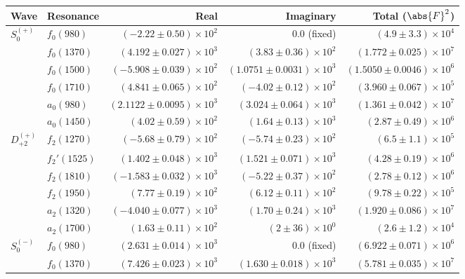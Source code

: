 \begin{table}[ht]
    \begin{center}
        \begin{tabular}{llrrr}\toprule
        Wave & Resonance & Real & Imaginary & Total ($\abs{F}^2$) \\\midrule
$S_{0}^{(+)}$ & $f_{0}(980)$ & $(-2.22 \pm 0.50) \times 10^{2}$ & $0.0$ (fixed) & $(4.9 \pm 3.3) \times 10^{4}$ \\
 & $f_{0}(1370)$ & $(4.192 \pm 0.027) \times 10^{3}$ & $(3.83 \pm 0.36) \times 10^{2}$ & $(1.772 \pm 0.025) \times 10^{7}$ \\
 & $f_{0}(1500)$ & $(-5.908 \pm 0.039) \times 10^{2}$ & $(1.0751 \pm 0.0031) \times 10^{3}$ & $(1.5050 \pm 0.0046) \times 10^{6}$ \\
 & $f_{0}(1710)$ & $(4.841 \pm 0.065) \times 10^{2}$ & $(-4.02 \pm 0.12) \times 10^{2}$ & $(3.960 \pm 0.067) \times 10^{5}$ \\
 & $a_{0}(980)$ & $(2.1122 \pm 0.0095) \times 10^{3}$ & $(3.024 \pm 0.064) \times 10^{3}$ & $(1.361 \pm 0.042) \times 10^{7}$ \\
 & $a_{0}(1450)$ & $(4.02 \pm 0.59) \times 10^{2}$ & $(1.64 \pm 0.13) \times 10^{3}$ & $(2.87 \pm 0.49) \times 10^{6}$ \\
$D_{+2}^{(+)}$ & $f_{2}(1270)$ & $(-5.68 \pm 0.79) \times 10^{2}$ & $(-5.74 \pm 0.23) \times 10^{2}$ & $(6.5 \pm 1.1) \times 10^{5}$ \\
 & $f_{2}'(1525)$ & $(1.402 \pm 0.048) \times 10^{3}$ & $(1.521 \pm 0.071) \times 10^{3}$ & $(4.28 \pm 0.19) \times 10^{6}$ \\
 & $f_{2}(1810)$ & $(-1.583 \pm 0.032) \times 10^{3}$ & $(-5.22 \pm 0.37) \times 10^{2}$ & $(2.78 \pm 0.12) \times 10^{6}$ \\
 & $f_{2}(1950)$ & $(7.77 \pm 0.19) \times 10^{2}$ & $(6.12 \pm 0.11) \times 10^{2}$ & $(9.78 \pm 0.22) \times 10^{5}$ \\
 & $a_{2}(1320)$ & $(-4.040 \pm 0.077) \times 10^{3}$ & $(1.70 \pm 0.24) \times 10^{3}$ & $(1.920 \pm 0.086) \times 10^{7}$ \\
 & $a_{2}(1700)$ & $(1.63 \pm 0.11) \times 10^{2}$ & $(2 \pm 36) \times 10^{0}$ & $(2.6 \pm 1.2) \times 10^{4}$ \\
$S_{0}^{(-)}$ & $f_{0}(980)$ & $(2.631 \pm 0.014) \times 10^{3}$ & $0.0$ (fixed) & $(6.922 \pm 0.071) \times 10^{6}$ \\
 & $f_{0}(1370)$ & $(7.426 \pm 0.023) \times 10^{3}$ & $(1.630 \pm 0.018) \times 10^{3}$ & $(5.781 \pm 0.035) \times 10^{7}$ \\

\end{tabular}
\end{center}
\end{table}
